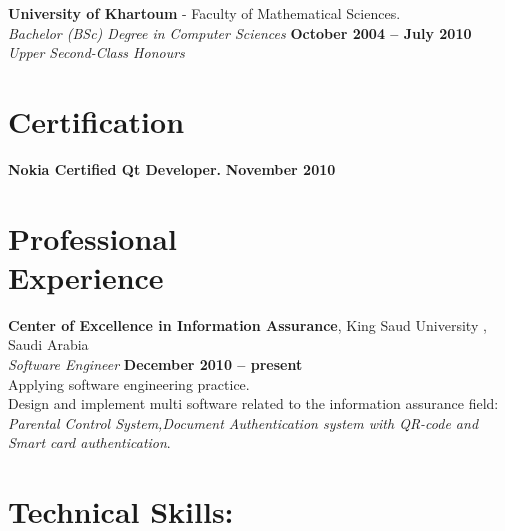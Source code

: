 \documentclass[margin,line]{resume}
\begin{document}
\begin{resume}
    \textbf{University of Khartoum} - Faculty of Mathematical Sciences. \vspace{2mm}\\\vspace{1mm}%
    \textsl{Bachelor (BSc) Degree in Computer Sciences} \hfill \textbf{ October 2004 -- July 2010} \\%
    \textsl{Upper Second-Class Honours}\vspace{-3mm}\\\vspace{-1mm}%

    \section{\mysidestyle Certification}

    \textbf{Nokia Certified Qt Developer.} \hfill \textbf{November 2010} \vspace{-3mm}\\\vspace{-1mm}%

    \section{\mysidestyle Professional\\Experience}

    \textbf{Center of Excellence in Information Assurance}, King Saud University , Saudi Arabia \vspace{2mm}\\\vspace{1mm}%
    \textsl{Software Engineer} \hfill \textbf{December 2010 -- present}\\
    Applying software engineering practice.\\
    Design and implement multi software related to the information assurance field:\\
   \textsl{Parental Control System,Document Authentication system with QR-code and Smart card authentication}.\\

    \section{\mysidestyle Technical Skills: } 


\end{resume}
\end{document}
